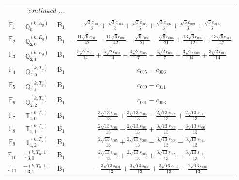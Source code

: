 \documentclass[fleqn,10pt,landscape]{article}
\begin{document}
\begin{itemize}
\begin{center}
\begin{longtable}{c|c|c|c}
 \hline \hline
\multicolumn{3}{r}{\footnotesize\it continued ...} \\ \endfoot

 \hline \hline
\multicolumn{3}{r}{} \\ \endlastfoot

$ \mathbb{F}_{1} $ & $\mathbb{Q}_{0}^{(k,A_{g})}$ & B$_{1}$ & $\frac{\sqrt{3} c_{001}}{3} + \frac{\sqrt{3} c_{003}}{3} + \frac{\sqrt{3} c_{005}}{3} + \frac{\sqrt{3} c_{006}}{3} + \frac{\sqrt{3} c_{009}}{3} + \frac{\sqrt{3} c_{011}}{3}$ \\
$ \mathbb{F}_{2} $ & $\mathbb{Q}_{2,0}^{(k,E_{g})}$ & B$_{1}$ & $- \frac{11 \sqrt{6} c_{001}}{42} - \frac{11 \sqrt{6} c_{003}}{42} - \frac{\sqrt{6} c_{005}}{21} - \frac{\sqrt{6} c_{006}}{21} + \frac{13 \sqrt{6} c_{009}}{42} + \frac{13 \sqrt{6} c_{011}}{42}$ \\
$ \mathbb{F}_{3} $ & $\mathbb{Q}_{2,1}^{(k,E_{g})}$ & B$_{1}$ & $\frac{5 \sqrt{2} c_{001}}{14} + \frac{5 \sqrt{2} c_{003}}{14} - \frac{4 \sqrt{2} c_{005}}{7} - \frac{4 \sqrt{2} c_{006}}{7} + \frac{3 \sqrt{2} c_{009}}{14} + \frac{3 \sqrt{2} c_{011}}{14}$ \\
$ \mathbb{F}_{4} $ & $\mathbb{Q}_{2,0}^{(k,T_{g})}$ & B$_{1}$ & $c_{005} - c_{006}$ \\
$ \mathbb{F}_{5} $ & $\mathbb{Q}_{2,1}^{(k,T_{g})}$ & B$_{1}$ & $c_{009} - c_{011}$ \\
$ \mathbb{F}_{6} $ & $\mathbb{Q}_{2,2}^{(k,T_{g})}$ & B$_{1}$ & $c_{001} - c_{003}$ \\
$ \mathbb{F}_{7} $ & $\mathbb{T}_{1,0}^{(k,T_{u})}$ & B$_{1}$ & $\frac{3 \sqrt{13} s_{001}}{13} + \frac{3 \sqrt{13} s_{003}}{13} - \frac{2 \sqrt{13} s_{009}}{13} + \frac{2 \sqrt{13} s_{011}}{13}$ \\
$ \mathbb{F}_{8} $ & $\mathbb{T}_{1,1}^{(k,T_{u})}$ & B$_{1}$ & $\frac{2 \sqrt{13} s_{001}}{13} - \frac{2 \sqrt{13} s_{003}}{13} + \frac{3 \sqrt{13} s_{005}}{13} - \frac{3 \sqrt{13} s_{006}}{13}$ \\
$ \mathbb{F}_{9} $ & $\mathbb{T}_{1,2}^{(k,T_{u})}$ & B$_{1}$ & $\frac{2 \sqrt{13} s_{005}}{13} + \frac{2 \sqrt{13} s_{006}}{13} - \frac{3 \sqrt{13} s_{009}}{13} - \frac{3 \sqrt{13} s_{011}}{13}$ \\
$ \mathbb{F}_{10} $ & $\mathbb{T}_{3,0}^{(k,T_{u},1)}$ & B$_{1}$ & $\frac{2 \sqrt{13} s_{001}}{13} + \frac{2 \sqrt{13} s_{003}}{13} + \frac{3 \sqrt{13} s_{009}}{13} - \frac{3 \sqrt{13} s_{011}}{13}$ \\
$ \mathbb{F}_{11} $ & $\mathbb{T}_{3,1}^{(k,T_{u},1)}$ & B$_{1}$ & $- \frac{3 \sqrt{13} s_{001}}{13} + \frac{3 \sqrt{13} s_{003}}{13} + \frac{2 \sqrt{13} s_{005}}{13} - \frac{2 \sqrt{13} s_{006}}{13}$ \\

\end{longtable}
\end{center}
\end{itemize}
\end{document}
